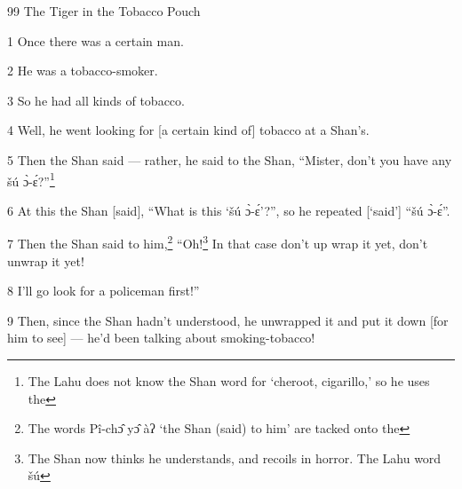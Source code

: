
99 The Tiger in the Tobacco Pouch

1 Once there was a certain man.

2 He was a tobacco-smoker.

3 So he had all kinds of tobacco.

4 Well, he went looking for [a certain kind of] tobacco at a Shan's.

5 Then the Shan said --- rather, he said to the Shan, ``Mister, don't you have
any šú ɔ̀-ɛ́?''\footnote{The Lahu does not know the Shan word for `cheroot, cigarillo,' so he uses the}

6 At this the Shan [said], ``What is this `šú ɔ̀-ɛ́'?'', so he repeated [`said']
``šú ɔ̀-ɛ́''.

7 Then the Shan said to him,\footnote{The words Pî-chɔ̂ yɔ̂ àʔ `the Shan (said) to him' are tacked onto the} ``Oh!\footnote{The Shan now thinks he understands, and recoils in horror. The Lahu word šú} In that case don't up wrap it yet, don't
unwrap it yet!

8 I'll go look for a policeman first!''

9 Then, since the Shan hadn't understood, he unwrapped it and put it down [for
him to see] --- he'd been talking about smoking-tobacco!

